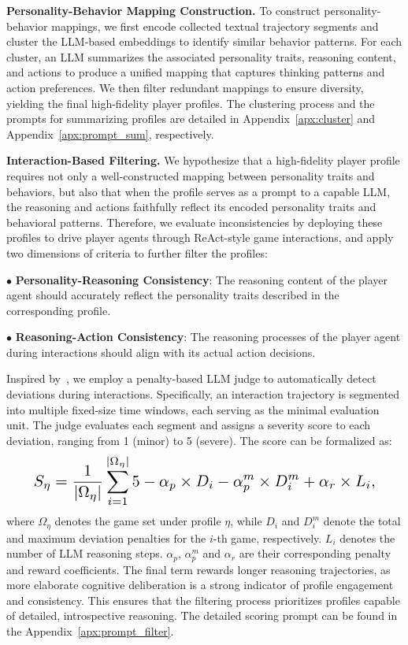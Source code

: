 \documentclass{article}
\theoremstyle{plain}
\theoremstyle{definition}
\theoremstyle{remark}
\begin{document}
\textbf{Personality-Behavior Mapping Construction.} To construct personality-behavior mappings, we first encode collected textual trajectory segments and cluster the LLM-based embeddings to identify similar behavior patterns. For each cluster, an LLM summarizes the associated personality traits, reasoning content, and actions to produce a unified mapping that captures thinking patterns and action preferences. We then filter redundant mappings to ensure diversity, yielding the final high-fidelity player profiles. The clustering process and the prompts for summarizing profiles are detailed in Appendix~\ref{apx:cluster} and Appendix~\ref{apx:prompt_sum}, respectively.



\textbf{Interaction-Based Filtering.} We hypothesize that a high-fidelity player profile requires not only a well-constructed mapping between personality traits and behaviors, but also that when the profile serves as a prompt to a capable LLM, the reasoning and actions faithfully reflect its encoded personality traits and behavioral patterns. Therefore, we evaluate inconsistencies by deploying these profiles to drive player agents through ReAct-style game interactions, and apply two dimensions of criteria to further filter the profiles:

$\bullet$ \textbf{Personality-Reasoning Consistency}: The reasoning content of the player agent should accurately reflect the personality traits described in the corresponding profile.

$\bullet$ \textbf{Reasoning-Action Consistency}: The reasoning processes of the player agent during interactions should align with its actual action decisions.


Inspired by~\cite{0001WZY00YGC00X25}, we employ a penalty-based LLM judge to automatically detect deviations during interactions. Specifically, an interaction trajectory is segmented into multiple fixed-size time windows, each serving as the minimal evaluation unit. The judge evaluates each segment and assigns a severity score to each deviation, ranging from 1 (minor) to 5 (severe). The score can be formalized as: 
\begin{equation}\label{eq:screen}
\resizebox{.90\linewidth}{!}{$
        \displaystyle
{S}_{\eta}=\frac{1}{| \Omega_{\eta} |}\sum_{i=1}^{| \Omega_{\eta} |}{5-\alpha_p\times {D}_i-\alpha_p^m\times {D}_{i}^{m}+\alpha_r\times {L}_i},
$}
\end{equation}
where $\Omega_{\eta}$ denotes the game set under profile $\eta$, while ${D}_i$ and ${D}^m_i$ denote the total and maximum deviation penalties for the $i$-th game, respectively. ${L}_i$ denotes the number of LLM reasoning steps. $\alpha_p$, $\alpha_p^m$ and $\alpha_r$ are their corresponding penalty and reward coefficients. The final term rewards longer reasoning trajectories, as more elaborate cognitive deliberation is a strong indicator of profile engagement and consistency. This ensures that the filtering process prioritizes profiles capable of detailed, introspective reasoning. The detailed scoring prompt can be found in the Appendix~\ref{apx:prompt_filter}.
\end{document}
